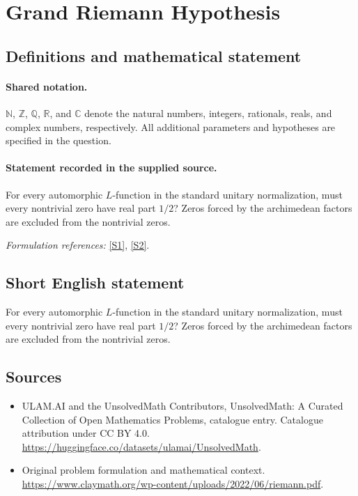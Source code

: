 \documentclass[11pt]{article}
\newcommand{\sref}[2]{\hyperlink{source:#1:#2}{[S#2]}}
\begin{document}
\section{Grand Riemann Hypothesis}\label{statement}

\subsection{Definitions and mathematical statement}

\paragraph{Shared notation.}$\mathbb N$, $\mathbb Z$, $\mathbb Q$, $\mathbb R$, and $\mathbb C$ denote the natural numbers, integers, rationals, reals, and complex numbers, respectively. All additional parameters and hypotheses are specified in the question.


\paragraph{Statement recorded in the supplied source.}
For every automorphic $L$-function in the standard unitary normalization, must every nontrivial zero have real part $1/2$? Zeros forced by the archimedean factors are excluded from the nontrivial zeros.
\par\smallskip\textit{Formulation references:} \sref{statement}{1}, \sref{statement}{2}.
\subsection{Short English statement}
For every automorphic $L$-function in the standard unitary normalization, must every nontrivial zero have real part $1/2$? Zeros forced by the archimedean factors are excluded from the nontrivial zeros.
\subsection{Sources}
\begin{itemize}
\item[\hypertarget{source:statement:1}{S1}] ULAM.AI and the UnsolvedMath Contributors, UnsolvedMath: A Curated Collection of Open Mathematics Problems, catalogue entry. Catalogue attribution under CC BY 4.0.
\url{https://huggingface.co/datasets/ulamai/UnsolvedMath}.
\item[\hypertarget{source:statement:2}{S2}] Original problem formulation and mathematical context.
\url{https://www.claymath.org/wp-content/uploads/2022/06/riemann.pdf}.
\end{itemize}
\label{end:statement}
\end{document}
